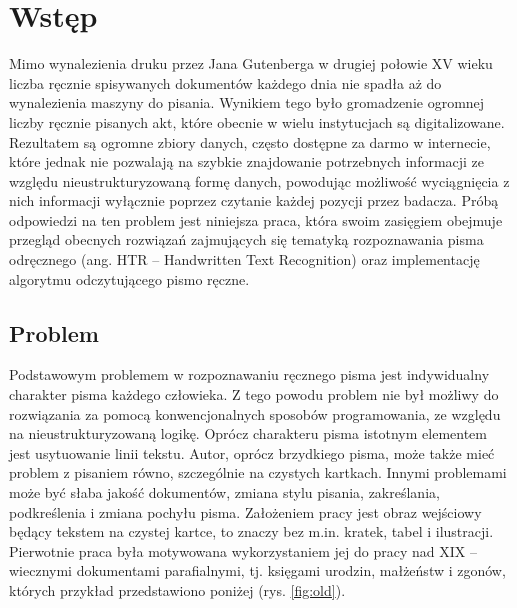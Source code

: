\chapter{Wstęp}
\label{cha:wstęp}

Mimo wynalezienia druku przez Jana Gutenberga w drugiej połowie XV wieku liczba ręcznie spisywanych dokumentów każdego dnia nie spadła aż do wynalezienia maszyny do pisania. Wynikiem tego było gromadzenie ogromnej liczby ręcznie pisanych akt, które obecnie w wielu instytucjach są digitalizowane. Rezultatem są ogromne zbiory danych, często dostępne za darmo w internecie, które jednak nie pozwalają na szybkie znajdowanie potrzebnych informacji ze względu nieustrukturyzowaną formę danych, powodując możliwość wyciągnięcia z nich informacji wyłącznie poprzez czytanie każdej pozycji przez badacza.
Próbą odpowiedzi na ten problem jest niniejsza praca, która swoim zasięgiem obejmuje przegląd obecnych rozwiązań zajmujących się tematyką rozpoznawania pisma odręcznego (ang. HTR – Handwritten Text Recognition) oraz implementację algorytmu odczytującego pismo ręczne.



\section{Problem}
\label{sec:celePracy}


Podstawowym problemem w rozpoznawaniu ręcznego pisma jest indywidualny charakter pisma każdego człowieka. Z tego powodu problem nie był możliwy do rozwiązania za pomocą konwencjonalnych sposobów programowania, ze względu na nieustrukturyzowaną logikę. Oprócz charakteru pisma istotnym elementem jest usytuowanie linii tekstu. Autor, oprócz brzydkiego pisma, może także mieć problem z pisaniem równo, szczególnie na czystych kartkach. Innymi problemami może być słaba jakość dokumentów, zmiana stylu pisania, zakreślania, podkreślenia i zmiana pochyłu pisma.
Założeniem pracy jest obraz wejściowy będący tekstem na czystej kartce, to znaczy bez m.in. kratek, tabel i ilustracji. Pierwotnie praca była motywowana wykorzystaniem jej do pracy nad XIX – wiecznymi dokumentami parafialnymi, tj. księgami urodzin, małżeństw i zgonów, których przykład przedstawiono poniżej (rys. \ref{fig:old}).

